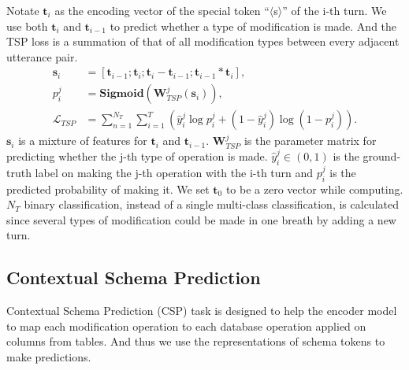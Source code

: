 \documentclass[a4paper]{article}
\begin{document}
Notate $\mathbf{t}_i$ as the encoding vector of the special token ``$\langle$s$\rangle$'' of the i-th turn. We use both $\mathbf{t}_i$ and $\mathbf{t}_{i-1}$ to predict whether a type of modification is made. And the TSP loss is a summation of that of all modification types between every adjacent utterance pair.
\begin{equation}
    \begin{aligned}
    \mathbf{s}_i &= [\mathbf{t}_{i-1} ; \mathbf{t}_i ; \mathbf{t}_i - \mathbf{t}_{i-1} ; \mathbf{t}_{i - 1} * \mathbf{t}_i], \\
    p_i^j &= \mathbf{Sigmoid} \left( \mathbf{W}_{TSP}^j( \mathbf{s}_i ) \right), \\
    \mathcal{L}_{TSP} &= \sum_{n=1}^{N_T} \sum_{i=1}^{T} \left( \hat{y}_i^j \log p_i^j + (1 - \hat{y}_i^j) \log (1 - p_i^j) \right).
    \end{aligned}
\end{equation}
$\mathbf{s}_i$ is a mixture of features for $\mathbf{t}_i$ and $\mathbf{t}_{i-1}$. $\mathbf{W}_{TSP}^j$ is the parameter matrix for predicting whether the j-th type of operation is made. $\hat{y}_i^j \in (0,1)$ is the ground-truth label on making the j-th operation with the i-th turn and $p_i^j$ is the predicted probability of making it. We set $\mathbf{t}_0$ to be a zero vector while computing. $N_T$ binary classification, instead of a single multi-class classification, is calculated since several types of modification could be made in one breath by adding a new turn.

\subsection{Contextual Schema Prediction}

Contextual Schema Prediction (CSP) task is designed to help the encoder model to map each modification operation to each database operation applied on columns from tables. And thus we use the representations of schema tokens to make predictions.
\end{document}
